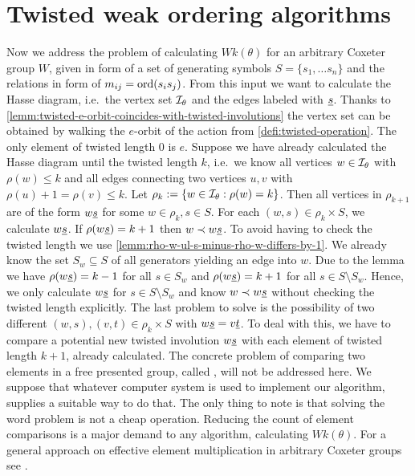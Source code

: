 \section{Twisted weak ordering algorithms}
\label{sec:twisted-involutions-algorithms}

Now we address the problem of calculating $Wk(\theta)$ for an arbitrary Coxeter group $W$, given in form of a set of generating symbols $S = \{s_1, \ldots s_n\}$ and the relations in form of $m_{ij} = \operatorname{ord}(s_i s_j)$. From this input we want to calculate the Hasse diagram, i.e.\ the vertex set $\mathcal{I}_{\theta}$ and the edges labeled with $\underline{s}$. Thanks to \ref{lemm:twisted-e-orbit-coincides-with-twisted-involutions} the vertex set can be obtained by walking the $e$-orbit of the action from \ref{defi:twisted-operation}. The only element of twisted length 0 is $e$. Suppose we have already calculated the Hasse diagram until the twisted length $k$, i.e.\ we know all vertices $w \in \mathcal{I}_{\theta}$ with $\rho(w) \leq k$ and all edges connecting two vertices $u,v$ with $\rho(u) + 1 = \rho(v) \leq k$. Let $\rho_k := \{ w \in \mathcal{I}_{\theta} : \rho(w) = k \}$. Then all vertices in $\rho_{k+1}$ are of the form $w \underline{s}$ for some $w \in \rho_k, s \in S$. For each $(w,s) \in \rho_k \times S$, we calculate $w \underline{s}$. If $\rho(w \underline{s}) = k + 1$ then $w \prec w \underline{s}$. To avoid having to check the twisted length we use \ref{lemm:rho-w-ul-s-minus-rho-w-differs-by-1}. We already know the set $S_w \subseteq S$ of all generators yielding an edge into $w$. Due to the lemma we have $\rho(w \underline{s}) = k - 1$ for all $s \in S_w$ and $\rho(w \underline{s}) = k + 1$ for all $s \in S \setminus S_w$. Hence, we only calculate $w \underline{s}$ for $s \in S \setminus S_w$ and know $w \prec w \underline{s}$ without checking the twisted length explicitly. The last problem to solve is the possibility of two different $(w,s),(v,t) \in \rho_k \times S$ with $w \underline{s} = v \underline{t}$. To deal with this, we have to compare a potential new twisted involution $w \underline{s}$ with each element of twisted length $k+1$, already calculated. The concrete problem of comparing two elements in a free presented group, called , will not be addressed here. We suppose that whatever computer system is used to implement our algorithm, supplies a suitable way to do that. The only thing to note is that solving the word problem is not a cheap operation. Reducing the count of element comparisons is a major demand to any algorithm, calculating $Wk(\theta)$. For a general approach on effective element multiplication in arbitrary Coxeter groups see \cite{casselman:coxeter-multiplication-i,casselman:coxeter-multiplication-ii}.

